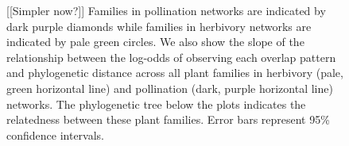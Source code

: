 \documentclass[12pt]{article}
\begin{document}
\begin{figure}[!h]
{    %
    [[Simpler now?]]
    Families in pollination networks are indicated
    by dark purple diamonds while families in herbivory
    networks are indicated by pale green circles.
    We also
    show the slope of the relationship between the
    log-odds of observing each overlap pattern and 
    phylogenetic distance across all plant families
    in herbivory (pale, green horizontal line) and
    pollination (dark, purple horizontal line) networks.
    The phylogenetic tree below the plots indicates the
    relatedness between these plant families. Error bars represent 95\% 
    confidence intervals.}
    \label{within_family_regression}
  \end{figure}
\end{document}
